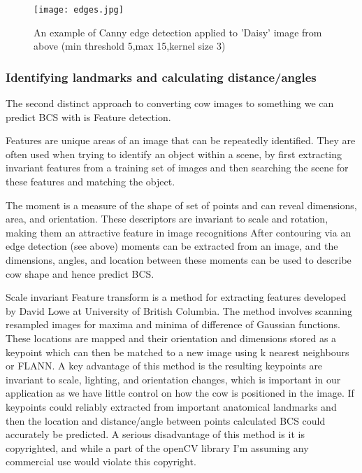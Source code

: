 \documentclass[11pt]{article}
\begin{document}

	\begin{figure}[h!]
		\centering
		\texttt{[image: edges.jpg]}
		\caption{An example of Canny edge detection applied to 'Daisy' image from above (min threshold 5,max 15,kernel size 3) }
		\label{fig:<+label+>}
	\end{figure}
\newpage


	\subsubsection{Identifying landmarks and calculating distance/angles}

	The second distinct approach to converting cow images to something we can predict BCS with is Feature detection.


	Features are unique areas of an image that can be repeatedly identified.
	They are often used when trying to identify an object within a scene, by first extracting invariant features from a training set of images and then searching the scene for these features and matching the object.


	The moment is a measure of the shape of set of points and can reveal dimensions, area, and orientation. 
	These descriptors are invariant to scale and rotation, making them an attractive feature in image recognitions
	After contouring via an edge detection (see above) moments can be extracted from an image, and the dimensions, angles, and location between these moments can be used to describe cow shape and hence predict BCS.


	
	Scale invariant Feature transform is a method for extracting features developed by David Lowe at University of British Columbia\cite{Lowe2004a}.
	The method involves scanning resampled images for maxima and minima of difference of Gaussian functions.
	These locations are mapped and their orientation and dimensions stored as a keypoint which can then be matched to a new image using k nearest neighbours or FLANN. 
	A key advantage of this method is the resulting keypoints are invariant to scale, lighting, and orientation changes, which is important in our application as we have little control on how the cow is positioned in the image.
	If keypoints could reliably extracted from important anatomical landmarks and then the location and distance/angle between points calculated BCS could accurately be predicted.
	A serious disadvantage of this method is it is copyrighted, and while a part of the openCV library I'm assuming any commercial use would violate this copyright.
\end{document}
